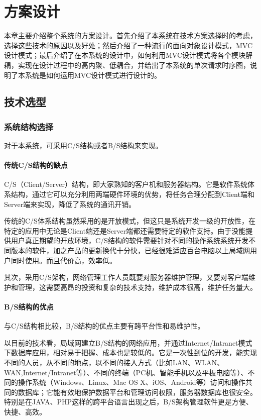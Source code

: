 
\chapter{方案设计}
本章主要介绍整个系统的方案设计。首先介绍了本系统在技术方案选择时的考虑，选择这些技术的原因以及好处；然后介绍了一种流行的面向对象设计模式，MVC设计模式；最后介绍了在本系统的设计中，如何利用MVC设计模式将各个模块解耦，实现在设计过程中的高内聚、低耦合，并给出了本系统的单次请求时序图，说明了本系统是如何运用MVC设计模式进行设计的。

\section{技术选型}
\subsection{系统结构选择}
对于本系统，可采用C/S结构或者B/S结构来实现。
\subsubsection{传统C/S结构的缺点}
C/S（Client/Server）结构，即大家熟知的客户机和服务器结构。它是软件系统体系结构，通过它可以充分利用两端硬件环境的优势，将任务合理分配到Client端和Server端来实现，降低了系统的通讯开销。

传统的C/S体系结构虽然采用的是开放模式，但这只是系统开发一级的开放性，在特定的应用中无论是Client端还是Server端都还需要特定的软件支持。由于没能提供用户真正期望的开放环境，C/S结构的软件需要针对不同的操作系统系统开发不同版本的软件，加之产品的更新换代十分快，已经很难适应百台电脑以上局域网用户同时使用。而且代价高，效率低。

其次，采用C/S架构，网络管理工作人员既要对服务器维护管理，又要对客户端维护和管理，这需要高昂的投资和复杂的技术支持，维护成本很高，维护任务量大。

\subsubsection{B/S结构的优点}
与C/S结构相比较，B/S结构的优点主要有跨平台性和易维护性。

以目前的技术看，局域网建立B/S结构的网络应用，并通过Internet/Intranet模式下数据库应用，相对易于把握、成本也是较低的。它是一次性到位的开发，能实现不同的人员，从不同的地点，以不同的接入方式（比如LAN、WLAN、WAN,Internet/Intranet等）、不同的终端（PC机、智能手机以及平板电脑等）、不同的操作系统（Windows、Linux、Mac OS X、iOS、Android等）访问和操作共同的数据库；它能有效地保护数据平台和管理访问权限，服务器数据库也很安全。特别是在JAVA、PHP这样的跨平台语言出现之后，B/S架构管理软件更是方便、快捷、高效。


